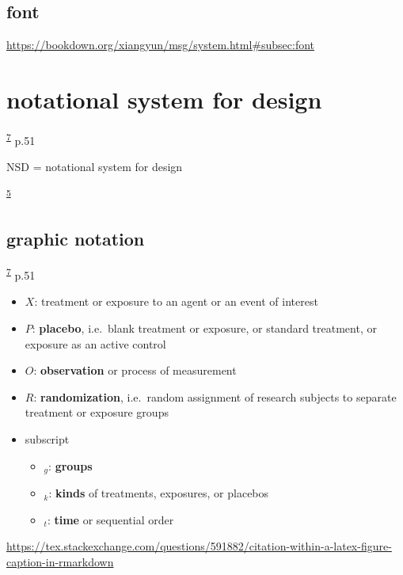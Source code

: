 \documentclass[
]{book}
\providecommand{\tightlist}{%
  \setlength{\itemsep}{0pt}\setlength{\parskip}{0pt}}
\theoremstyle{definition}
\theoremstyle{definition}
\theoremstyle{definition}
\theoremstyle{definition}
\theoremstyle{remark}
\begin{document}
\hypertarget{font}{%
\section{font}\label{font}}

\url{https://bookdown.org/xiangyun/msg/system.html\#subsec:font}

\hypertarget{notational-system-for-design}{%
\chapter{notational system for design}\label{notational-system-for-design}}

\textsuperscript{\protect\hyperlink{ref-hu2022}{7}} p.51

NSD = notational system for design

\textsuperscript{\protect\hyperlink{ref-campbell1963}{5}}

\hypertarget{graphic-notation}{%
\section{graphic notation}\label{graphic-notation}}

\textsuperscript{\protect\hyperlink{ref-hu2022}{7}} p.51

\begin{itemize}
\tightlist
\item
  \(X\): treatment or exposure to an agent or an event of interest
\item
  \(P\): \textbf{placebo}, i.e.~blank treatment or exposure, or standard treatment, or exposure as an active control
\item
  \(O\): \textbf{observation} or process of measurement
\item
  \(R\): \textbf{randomization}, i.e.~random assignment of research subjects to separate treatment or exposure groups
\item
  subscript

  \begin{itemize}
  \tightlist
  \item
    \(_g\): \textbf{groups}
  \item
    \(_k\): \textbf{kinds} of treatments, exposures, or placebos
  \item
    \(_t\): \textbf{time} or sequential order
  \end{itemize}
\end{itemize}

\url{https://tex.stackexchange.com/questions/591882/citation-within-a-latex-figure-caption-in-rmarkdown}
\end{document}
